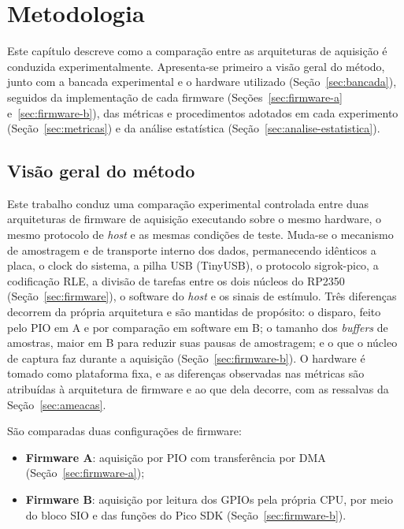 \chapter{Metodologia}\label{cap:metodologia}

Este capítulo descreve como a comparação entre as arquiteturas de aquisição é
conduzida experimentalmente. Apresenta-se primeiro a visão geral do método,
junto com a bancada experimental e o hardware utilizado
(Seção~\ref{sec:bancada}), seguidos da implementação de cada firmware
(Seções~\ref{sec:firmware-a} e~\ref{sec:firmware-b}), das métricas e
procedimentos adotados em cada experimento (Seção~\ref{sec:metricas}) e da
análise estatística (Seção~\ref{sec:analise-estatistica}).

\section{Visão geral do método}

Este trabalho conduz uma comparação experimental controlada entre duas
arquiteturas de firmware de aquisição executando sobre o mesmo hardware, o
mesmo protocolo de \emph{host} e as mesmas condições de teste. Muda-se o
mecanismo de amostragem e de transporte interno dos dados, permanecendo
idênticos a placa, o clock do sistema, a pilha \ac{USB} (TinyUSB), o protocolo
sigrok-pico, a codificação \ac{RLE}, a divisão de tarefas entre os dois
núcleos do RP2350 (Seção~\ref{sec:firmware}), o software do \emph{host} e os
sinais de estímulo. Três diferenças decorrem da própria arquitetura e são
mantidas de propósito: o disparo, feito pelo \ac{PIO} em A e por comparação
em software em B; o tamanho dos \emph{buffers} de amostras, maior em B para
reduzir suas pausas de amostragem; e o que o núcleo de captura faz durante a
aquisição (Seção~\ref{sec:firmware-b}). O hardware é tomado como plataforma
fixa, e as diferenças observadas nas métricas são atribuídas à arquitetura de
firmware e ao que dela decorre, com as ressalvas da
Seção~\ref{sec:ameacas}.

São comparadas duas configurações de firmware:

\begin{itemize}
  \item \textbf{Firmware A}: aquisição por \ac{PIO} com transferência por \ac{DMA} (Seção~\ref{sec:firmware-a});
  \item \textbf{Firmware B}: aquisição por leitura dos \acp{GPIO} pela própria \ac{CPU}, por meio do bloco \ac{SIO} e das funções do Pico \ac{SDK} \cite{rpi2024sdk} (Seção~\ref{sec:firmware-b}).
\end{itemize}


